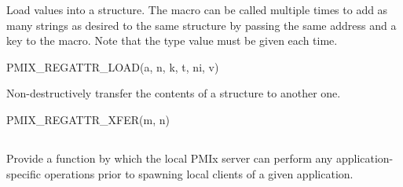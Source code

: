 Load values into a  structure. The macro can be called multiple times to add as many strings as desired to the same structure by passing the same address and a  key to the macro. Note that the  type value must be given each time.

\cspecificstart
\begin{codepar}
PMIX_REGATTR_LOAD(a, n, k, t, ni, v)
\end{codepar}
\cspecificend

\begin{arglist}
\end{arglist}


Non-destructively transfer the contents of a  structure to another one.

\cspecificstart
\begin{codepar}
PMIX_REGATTR_XFER(m, n)
\end{codepar}
\cspecificend

\begin{arglist}
\end{arglist}


\subsection{}

\summary

Provide a function by which the local \ac{PMIx} server can perform any application-specific operations prior to spawning local clients of a given application.

